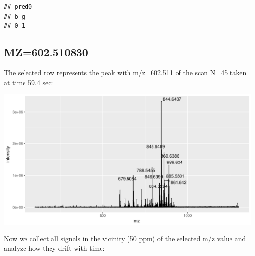 \documentclass[]{article}
\newenvironment{Shaded}{\begin{snugshade}}{\end{snugshade}}
\newcommand{\KeywordTok}[1]{\textcolor[rgb]{0.13,0.29,0.53}{\textbf{#1}}}
\newcommand{\FloatTok}[1]{\textcolor[rgb]{0.00,0.00,0.81}{#1}}
\newcommand{\StringTok}[1]{\textcolor[rgb]{0.31,0.60,0.02}{#1}}
\newcommand{\OperatorTok}[1]{\textcolor[rgb]{0.81,0.36,0.00}{\textbf{#1}}}
\newcommand{\NormalTok}[1]{#1}
\begin{document}
\begin{verbatim}
## pred0
## b g 
## 0 1
\end{verbatim}

\subsection{MZ=602.510830}\label{mz602.510830}

\begin{Shaded}
\end{Shaded}

The selected row represents the peak with m/z=602.511 of the scan N=45
taken at time 59.4 sec:

\begin{Shaded}
\end{Shaded}

\includegraphics{Supplementary_document_files/figure-latex/ion.plots.602-1.pdf}

Now we collect all signals in the vicinity (50 ppm) of the selected m/z
value and analyze how they drift with time:

\begin{Shaded}
\end{Shaded}
\end{document}
